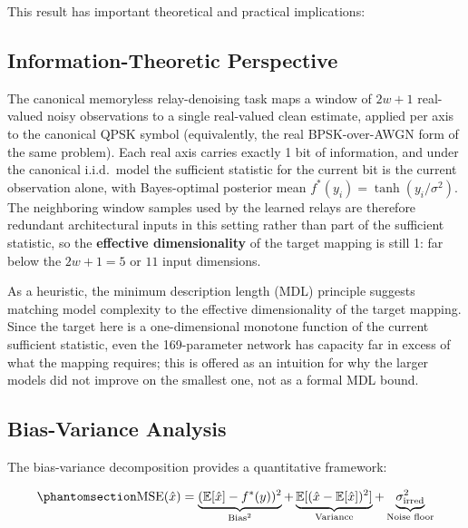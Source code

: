 This result has important theoretical and practical implications:

\subsection{Information-Theoretic Perspective}\label{sec:information-theoretic-perspective}

The canonical memoryless relay-denoising task maps a window of \(2w+1\) real-valued noisy observations to a single real-valued clean estimate, applied per axis to the canonical QPSK symbol (equivalently, the real BPSK-over-AWGN form of the same problem). Each real axis carries exactly 1 bit of information, and under the canonical i.i.d.\ model the sufficient statistic for the current bit is the current observation alone, with Bayes-optimal posterior mean \(f^*(y_i) = \tanh(y_i / \sigma^2)\). The neighboring window samples used by the learned relays are therefore redundant architectural inputs in this setting rather than part of the sufficient statistic, so the \textbf{effective dimensionality} of the target mapping is still 1: far below the \(2w+1 = 5\) or \(11\) input dimensions.

As a heuristic, the minimum description length (MDL) principle suggests matching model complexity to the effective dimensionality of the target mapping. Since the target here is a one-dimensional monotone function of the current sufficient statistic, even the 169-parameter network has capacity far in excess of what the mapping requires; this is offered as an intuition for why the larger models did not improve on the smallest one, not as a formal MDL bound.

\subsection{Bias-Variance Analysis}\label{sec:bias-variance-analysis}

The bias-variance decomposition \cite{GoodfellowBengioCourville2016DeepLearning} provides a quantitative framework:

\begin{equation}\protect\phantomsection\label{eq:bias-variance-relay}{\text{MSE}(\hat{x}) = \underbrace{(\mathbb{E}[\hat{x}] - f^*(y))^2}_{\text{Bias}^2} + \underbrace{\mathbb{E}[(\hat{x} - \mathbb{E}[\hat{x}])^2]}_{\text{Variance}} + \underbrace{\sigma^2_{\text{irred}}}_{\text{Noise floor}}
}\end{equation}

